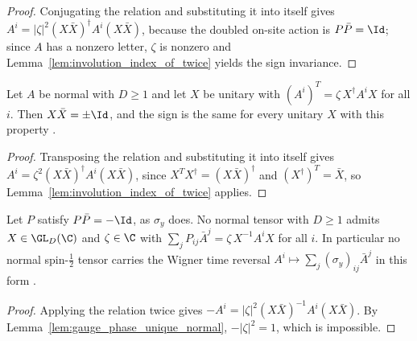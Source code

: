 \begin{proof}\leanok
    Conjugating the relation and substituting it into itself gives
    $A^i=|\zeta|^2(X\bar X)^\dagger A^i(X\bar X)$, because the doubled on-site
    action is $P\bar P=\Id$; since $A$ has a nonzero letter, $\zeta$ is
    nonzero and Lemma~\ref{lem:involution_index_of_twice} yields the sign
    invariance.
\end{proof}

\begin{lemma}
    \label{thm:reflection_index}
    \leanok
    Let $A$ be normal with $D\ge1$ and let $X$ be unitary with
    $(A^i)^{T}=\zeta\,X^\dagger A^iX$ for all $i$.  Then $X\bar X=\pm\Id$, and the
    sign is the same for every unitary $X$ with this property
    \cite[Section~III.A]{Cirac2021Matrix}.
\end{lemma}

\begin{proof}\leanok
    Transposing the relation and substituting it into itself gives
    $A^i=\zeta^2(X\bar X)^\dagger A^i(X\bar X)$, since
    $X^{T}X^\dagger=(X\bar X)^\dagger$ and $(X^\dagger)^{T}=\bar X$, so
    Lemma~\ref{lem:involution_index_of_twice} applies.
\end{proof}

\begin{lemma}
    \label{thm:kramers_obstruction}
    \leanok
    Let $P$ satisfy $P\bar P=-\Id$, as $\sigma_y$ does.  No normal tensor with
    $D\ge1$ admits $X\in\GL_{D}(\C)$ and $\zeta\in\C$ with
    $\sum_jP_{ij}\bar A^j=\zeta\,X^{-1}A^iX$ for all $i$.  In particular no normal
    spin-$\tfrac12$ tensor carries the Wigner time reversal
    $A^i\mapsto\sum_j(\sigma_y)_{ij}\bar A^j$ in this form
    \cite[Section~III.A]{Cirac2021Matrix}.
\end{lemma}

\begin{proof}\leanok
    Applying the relation twice gives
    $-A^i=|\zeta|^2(X\bar X)^{-1}A^i(X\bar X)$.  By
    Lemma~\ref{lem:gauge_phase_unique_normal}, $-|\zeta|^2=1$, which is impossible.
\end{proof}

